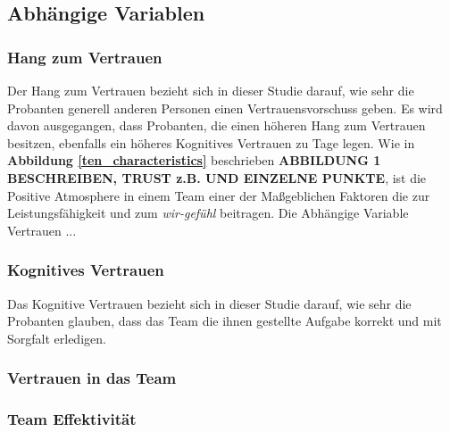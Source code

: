 \documentclass[a4paper,11pt]{article}%
\renewcommand{\\}{\vspace*{0.5\baselineskip} \newline}
\begin{document}
	\subsection{Abhängige Variablen}
		\subsubsection{Hang zum  Vertrauen}
Der Hang zum Vertrauen bezieht sich in dieser Studie darauf, wie sehr die Probanten generell anderen Personen einen Vertrauensvorschuss geben.
Es wird davon ausgegangen, dass Probanten, die einen höheren Hang zum Vertrauen besitzen, ebenfalls ein höheres Kognitives Vertrauen zu Tage legen. 
			Wie in \textbf{Abbildung \ref{ten_characteristics}} beschrieben \textbf{ABBILDUNG 1 BESCHREIBEN, TRUST z.B. UND EINZELNE PUNKTE}, ist die Positive Atmosphere in einem Team einer der Maßgeblichen Faktoren die zur Leistungsfähigkeit und zum \textit{\glqq wir-gefühl\grqq} beitragen.
			Die Abhängige Variable Vertrauen ...	
		\subsubsection{Kognitives Vertrauen}
Das Kognitive Vertrauen bezieht sich in dieser Studie darauf, wie sehr die Probanten glauben, dass das Team die ihnen gestellte Aufgabe korrekt und mit Sorgfalt erledigen.
		\subsubsection{Vertrauen in das Team}
		\subsubsection{Team Effektivität}
			
\end{document}
